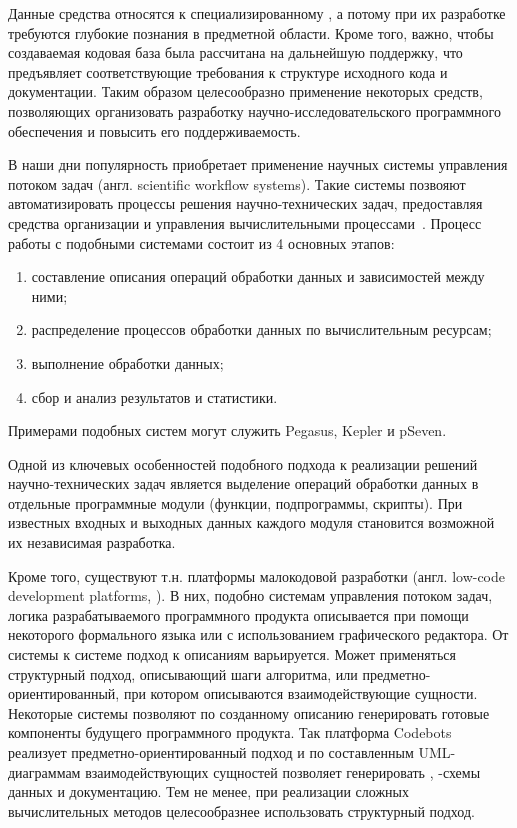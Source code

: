 Данные средства относятся к специализированному , а потому при их разработке требуются глубокие познания в предметной области. Кроме того, важно, чтобы создаваемая кодовая база была рассчитана на дальнейшую поддержку, что предъявляет соответствующие требования к структуре исходного кода и документации. Таким образом целесообразно применение некоторых средств, позволяющих организовать разработку научно-исследовательского программного обеспечения и повысить его поддерживаемость.

В наши дни популярность приобретает применение научных системы управления потоком задач (англ. scientific workflow systems). Такие системы позвояют автоматизировать процессы решения научно-технических задач, предоставляя средства организации и управления вычислительными процессами~\cite{DeelmanWorkflow2009}. Процесс работы с подобными системами состоит из 4 основных этапов:
\begin{enumerate}[1)]
    \item составление описания операций обработки данных и зависимостей между ними;
    \item распределение процессов обработки данных по вычислительным ресурсам;
    \item выполнение обработки данных;
    \item сбор и анализ результатов и статистики.
\end{enumerate}

Примерами подобных систем могут служить Pegasus\cite{DeelmanPegasus2016}, Kepler\cite{AltintasKepler2004} и pSeven\cite{NazarenkoDFM2015}.

Одной из ключевых особенностей подобного подхода к реализации решений научно-технических задач является выделение операций обработки данных в отдельные программные модули (функции, подпрограммы, скрипты). При известных входных и выходных данных каждого модуля становится возможной их независимая разработка\cite{DanilovPar2011}.

Кроме того, существуют т.н. платформы малокодовой разработки (англ. low-code development platforms, )\cite{DiRuscio2022}. В них, подобно системам управления потоком задач, логика разрабатываемого программного продукта описывается при помощи некоторого формального языка или с использованием графического редактора. От системы к системе подход к описаниям варьируется. Может применяться структурный подход, описывающий шаги алгоритма, или предметно-ориентированный, при котором описываются взаимодействующие сущности. Некоторые системы позволяют по созданному описанию генерировать готовые компоненты будущего программного продукта. Так платформа Codebots реализует предметно-ориентированный подход и по составленным UML-диаграммам взаимодействующих сущностей позволяет генерировать , -схемы данных и документацию\cite{DiRuscio2022}. Тем не менее, при реализации сложных вычислительных методов целесообразнее использовать структурный подход.

